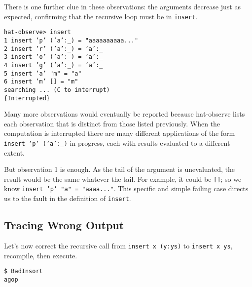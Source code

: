 \documentclass[12pt]{article}
\newcommand{\mkblue}[1]{#1}
\begin{document}
There is one further clue in these observations: the arguments decrease
just as expected, confirming that the recursive loop must be
in {\tt insert}.
\begin{tabbing}
{\tt hat-observe> insert } \\
{\tt \mkblue{1} insert 'p' ('a':\verb"_") = "aaaaaaaaaa..." } \\
{\tt \mkblue{2} insert 'r' ('a':\verb"_") = 'a':\verb"_" } \\
{\tt \mkblue{3} insert 'o' ('a':\verb"_") = 'a':\verb"_" } \\
{\tt \mkblue{4} insert 'g' ('a':\verb"_") = 'a':\verb"_" } \\
{\tt \mkblue{5} insert 'a' "m" = "a" } \\
{\tt \mkblue{6} insert 'm' [] = "m" } \\
{\tt searching ... (C to interrupt) } \\
{\tt \{Interrupted\} }
\end{tabbing}
Many more observations would eventually be reported because
hat-observe lists each observation that is distinct from
those listed previously.
When the computation is interrupted
there are many different applications of the form {\tt insert 'p' ('a':\verb"_")}
in progress, each with results evaluated to a different extent.

But observation 1 is enough. As the tail of the argument is
unevaluated, the result would be the same whatever the tail.
For example, it could be {\tt []}; so we know
{\tt insert 'p' "a" = "aaaa..."}.
This specific and simple
failing case directs us to the fault in the definition
of {\tt insert}.

\subsection{Tracing Wrong Output}

Let's now correct the recursive call from {\tt insert x (y:ys)} to
{\tt insert x ys}, recompile, then execute.
\begin{tabbing}
{\tt \$ BadInsort } \\
{\tt agop } \\
\end{tabbing}
\end{document}
